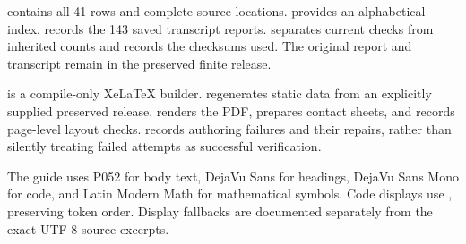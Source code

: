  contains all 41 rows and complete source locations.  provides an alphabetical index.  records the 143 saved transcript reports.  separates current checks from inherited counts and records the checksums used. The original report and transcript remain in the preserved finite release.

 is a compile-only XeLaTeX builder.  regenerates static data from an explicitly supplied preserved release.  renders the PDF, prepares contact sheets, and records page-level layout checks.  records authoring failures and their repairs, rather than silently treating failed attempts as successful verification.

The guide uses P052 for body text, DejaVu Sans for headings, DejaVu Sans Mono for code, and Latin Modern Math for mathematical symbols. Code displays use , preserving token order. Display fallbacks are documented separately from the exact UTF-8 source excerpts.

